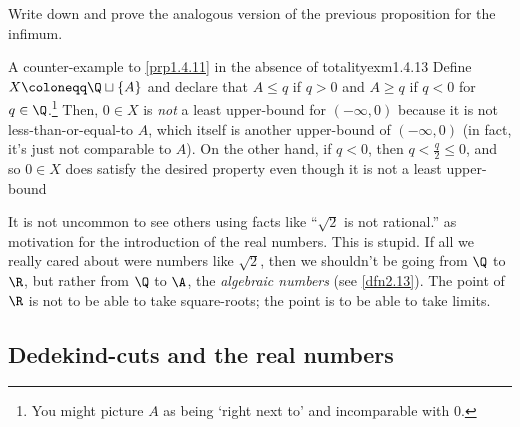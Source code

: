 \begin{exr}{}{}
Write down and prove the analogous version of the previous proposition for the infimum.
\end{exr}
\begin{exm}{A counter-example to \cref{prp1.4.11} in the absence of totality}{exm1.4.13}
Define $X\coloneqq \Q \sqcup \{ A\}$ and declare that $A\leq q$ if $q>0$ and $A\geq q$ if $q<0$ for $q\in \Q$.\footnote{You might picture $A$ as being `right next to' and incomparable with $0$.}  Then, $0\in X$ is \emph{not} a least upper-bound for $(-\infty ,0)$ because it is not less-than-or-equal-to $A$, which itself is another upper-bound of $(-\infty ,0)$ (in fact, it's just not comparable to $A$).  On the other hand, if $q<0$, then $q<\frac{q}{2}\leq 0$, and so $0\in X$ does satisfy the desired property even though it is not a least upper-bound
\end{exm}

\begin{rmk}
It is not uncommon to see others using facts like ``$\sqrt{2}$ is not rational.'' as motivation for the introduction of the real numbers.  This is stupid.  If all we really cared about were numbers like $\sqrt{2}$, then we shouldn't be going from $\Q$ to $\R$, but rather from $\Q$ to $\A$, the \emph{algebraic numbers} (see \cref{dfn2.13}).  The point of $\R$ is not to be able to take square-roots; the point is to be able to take limits.
\end{rmk}

\subsection{Dedekind-cuts and the real numbers}\label{sbs1.4.2}

